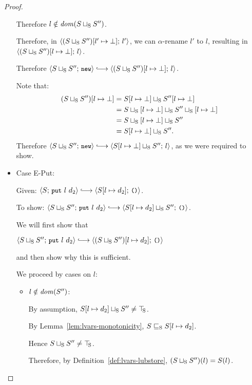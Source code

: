 \begin{proof}
\begin{itemize}
    Therefore $l \notin \mathit{dom}(S \sqcup_{\mathrm{S}} S'')$.

    Therefore, in
    $\langle (S \sqcup_{\mathrm{S}} S'')[l' \mapsto \bot];\, l' \rangle$, we can
    $\alpha$-rename $l'$ to $l$, resulting in
    $\langle (S \sqcup_{\mathrm{S}} S'')[l \mapsto \bot];\, l \rangle$.

    Therefore $\config{\lubstore{S}{S''}}{\NEW} \parstepsto
    \config{\extSRaw{(\lubstore{S}{S''})}{l}{\bot}}{l}$.

    Note that:
    \begin{align*}
      (S \sqcup_{\mathrm{S}} S'')[l \mapsto \bot] &=
      S[l \mapsto \bot] \sqcup_{\mathrm{S}} S''[l \mapsto \bot] \\ &=
      S \sqcup_{\mathrm{S}} \left[ l \mapsto \bot \right] \sqcup_{\mathrm{S}} S'' \sqcup_{\mathrm{S}} \left[ l \mapsto \bot \right]
      \\ &=
      S \sqcup_{\mathrm{S}} \left[ l \mapsto \bot \right] \sqcup_{\mathrm{S}} S''
      \\ &= S[l \mapsto \bot] \sqcup_{\mathrm{S}} S''.
    \end{align*}
    Therefore $\config{\lubstore{S}{S''}}{\NEW} \parstepsto
    \config{\lubstore{\extSRaw{S}{l}{\bot}}{S''}}{l}$, as we were
    required to show.

  \item Case {\sc E-Put}:

    Given: $\config{S}{\putexp{l}{d_2}} \parstepsto
    \config{\extSRaw{S}{l}{d_2}}{\unit}$.

    To show: $\config{\lubstore{S}{S''}}{\putexp{l}{d_2}} \parstepsto
    \config{\lubstore{\extSRaw{S}{l}{d_2}}{S''}}{\unit}$.

    We will first show that

    $\config{\lubstore{S}{S''}}{\putexp{l}{d_2}} \parstepsto
    \config{\extSRaw{(\lubstore{S}{S''})}{l}{d_2}}{\unit}$

    and then show why this is sufficient.

    We proceed by cases on $l$:

    \begin{itemize}
    \item $l \notin \mathit{dom}(S'')$:

      By assumption, $S[l \mapsto d_2] \sqcup_{\mathrm{S}} S'' \neq \top\hspace{-0.85mm}_{\mathrm{S}}$.

      By Lemma~\ref{lem:lvars-monotonicity},
      $S \sqsubseteq_{\mathrm{S}} S[l \mapsto d_2]$.

      Hence $S \sqcup_{\mathrm{S}} S'' \neq \top\hspace{-0.85mm}_{\mathrm{S}}$.

      Therefore, by Definition~\ref{def:lvars-lubstore},
      $(S \sqcup_{\mathrm{S}} S'')(l) = S(l)$.


\end{itemize}
\end{itemize}
\end{proof}
